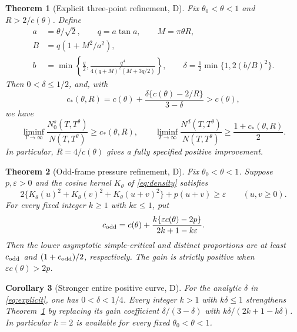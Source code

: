\documentclass[11pt]{article}
\newtheorem{theorem}{Theorem}[section]
\newtheorem{corollary}[theorem]{Corollary}
\theoremstyle{remark}
\begin{document}
\begin{theorem}[Explicit three-point refinement, D]\label{thm:main}
Fix $\theta_0<\theta<1$ and $R>2/c(\theta)$. Define
\begin{equation}\label{eq:explicit}
\begin{aligned}
 a&=\theta/\sqrt2,\qquad q=a\tan a,\qquad M=\pi\theta R,\\
 B&=q(1+M^2/a^2),\\
 b&=\min\left\{\frac q2,
       \frac{q^4}{4(q+M)^2(M+3q/2)}\right\},\qquad
 \delta=\frac12\min\{1,2(b/B)^2\}.
\end{aligned}
\end{equation}
Then $0<\delta\le1/2$, and, with
\begin{equation}\label{eq:cstar}
 c_*(\theta,R)=c(\theta)
       +\frac{\delta\{c(\theta)-2/R\}}{3-\delta}>c(\theta),
\end{equation}
we have
\begin{equation}\label{eq:mainbounds}
 \liminf_{T\to\infty}\frac{N_0^s(T,T^\theta)}{N(T,T^\theta)}
 \ge c_*(\theta,R),\qquad
 \liminf_{T\to\infty}\frac{N^d(T,T^\theta)}{N(T,T^\theta)}
 \ge\frac{1+c_*(\theta,R)}2.
\end{equation}
In particular, $R=4/c(\theta)$ gives a fully specified positive improvement.
\end{theorem}

\begin{theorem}[Odd-frame pressure refinement, D]\label{thm:pressure}
Fix $\theta_0<\theta<1$. Suppose $p,\varepsilon>0$ and the cosine kernel
$K_\theta$ of \eqref{eq:density} satisfies
\begin{equation}\label{eq:pressure}
 2\{K_\theta(u)^2+K_\theta(v)^2+K_\theta(u+v)^2\}
 +p(u+v)\ge\varepsilon\qquad(u,v\ge0).
\end{equation}
For every fixed integer $k\ge1$ with $k\varepsilon\le1$, put
\begin{equation}\label{eq:pressureconstant}
 c_{\rm odd}=c(\theta)+
 \frac{k\{\varepsilon c(\theta)-2p\}}{2k+1-k\varepsilon}.
\end{equation}
Then the lower asymptotic simple-critical and distinct proportions are at
least $c_{\rm odd}$ and $(1+c_{\rm odd})/2$, respectively. The gain is
strictly positive when $\varepsilon c(\theta)>2p$.
\end{theorem}

\begin{corollary}[Stronger entire positive curve, D]\label{cor:wholecurve}
For the analytic $\delta$ in \eqref{eq:explicit}, one has $0<\delta<1/4$.
Every integer $k>1$ with $k\delta\le1$ strengthens
Theorem~\ref{thm:main} by replacing its gain coefficient
$\delta/(3-\delta)$ with $k\delta/(2k+1-k\delta)$. In particular $k=2$
is available for every fixed $\theta_0<\theta<1$.
\end{corollary}
\end{document}
